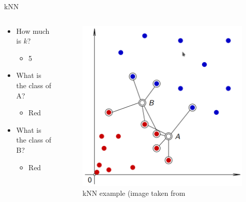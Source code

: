 \documentclass[aspectratio=169]{beamer}
\begin{document}
\begin{frame}{kNN}
    \begin{columns}
    \begin{column}{0.5\textwidth}
        \begin{itemize}[<+->]
            \item How much is $k$?
                \begin{itemize}
                    \item 5
                \end{itemize}
            \item What is the class of A?
                \begin{itemize}
                    \item Red
                \end{itemize}
            \item What is the class of B?
                \begin{itemize}
                    \item Red
                \end{itemize}
        \end{itemize}
    \end{column}
    \begin{column}{0.5\textwidth}  %
        \begin{center}
            \begin{figure}
                \includegraphics[scale=0.33]{./images/knn.png}
            \caption{kNN example (image taken from \cite{vi}}
            \end{figure}
        \end{center}
    \end{column}
    \end{columns}
\end{frame}
\end{document}
